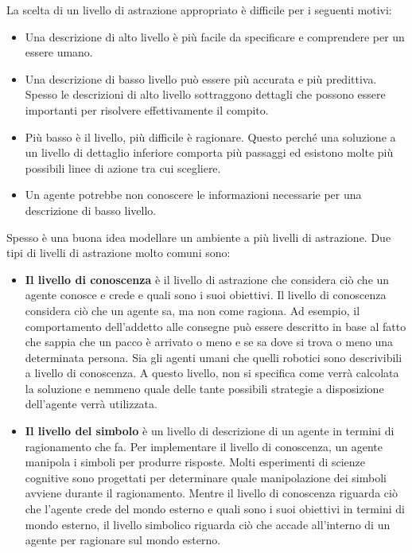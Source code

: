 \documentclass[a4paper]{extarticle}
\begin{document}
La scelta di un livello di astrazione appropriato è difficile per i seguenti motivi:
\begin{itemize}
\item Una descrizione di alto livello è più facile da specificare e comprendere per un essere umano.
\item Una descrizione di basso livello può essere più accurata e più predittiva. Spesso le descrizioni di alto livello sottraggono dettagli che possono essere importanti per risolvere effettivamente il compito.
\item Più basso è il livello, più difficile è ragionare. Questo perché una soluzione a un livello di dettaglio inferiore comporta più passaggi ed esistono molte più possibili linee di azione tra cui scegliere.
\item Un agente potrebbe non conoscere le informazioni necessarie per una descrizione di basso livello.
\end{itemize}

Spesso è una buona idea modellare un ambiente a più livelli di astrazione. Due tipi di livelli di astrazione molto comuni sono:
\begin{itemize}
\item \textbf{Il livello di conoscenza} è il livello di astrazione che considera ciò che un agente conosce e crede e quali sono i suoi obiettivi. Il livello di conoscenza considera ciò che un agente sa, ma non come ragiona. Ad esempio, il comportamento dell'addetto alle consegne può essere descritto in base al fatto che sappia che un pacco è arrivato o meno e se sa dove si trova o meno una determinata persona. Sia gli agenti umani che quelli robotici sono descrivibili a livello di conoscenza. A questo livello, non si specifica come verrà calcolata la soluzione e nemmeno quale delle tante possibili strategie a disposizione dell'agente verrà utilizzata.
\item \textbf{Il livello del simbolo} è un livello di descrizione di un agente in termini di ragionamento che fa. Per implementare il livello di conoscenza, un agente manipola i simboli per produrre risposte. Molti esperimenti di scienze cognitive sono progettati per determinare quale manipolazione dei simboli avviene durante il ragionamento. Mentre il livello di conoscenza riguarda ciò che l'agente crede del mondo esterno e quali sono i suoi obiettivi in termini di mondo esterno, il livello simbolico riguarda ciò che accade all'interno di un agente per ragionare sul mondo esterno.
\end{itemize}
\end{document}
